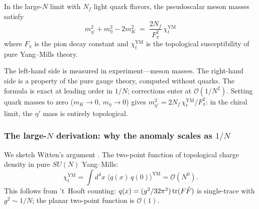 \begin{proposition}\label{prop:witten-veneziano}
In the large-$N$ limit with $N_f$ light quark flavors, the pseudoscalar meson masses satisfy
\begin{equation}\label{eq:witten-veneziano}
  \boxed{\;m_{\eta'}^2 + m_\eta^2 - 2m_K^2 \;=\; \frac{2N_f}{F_\pi^2}\,\chi_t^{\mathrm{YM}}\;}
\end{equation}
where $F_\pi$ is the pion decay constant and $\chi_t^{\mathrm{YM}}$ is the topological susceptibility of pure Yang--Mills theory.
\end{proposition}

\noindent The left-hand side is measured in experiment---meson masses.  The right-hand side is a property of the pure gauge theory, computed without quarks.  The formula is exact at leading order in $1/N$; corrections enter at $\mathcal{O}(1/N^2)$.  Setting quark masses to zero ($m_K\to 0$, $m_\eta\to 0$) gives $m_{\eta'}^2 = 2N_f\,\chi_t^{\mathrm{YM}}/F_\pi^2$: in the chiral limit, the $\eta'$ mass is entirely topological.

\subsubsection{The large-$N$ derivation: why the anomaly scales as $1/N$}

We sketch Witten's argument \cite{Witten1979U1GoldstoneBoson}.  The two-point function of topological charge density in pure $SU(N)$ Yang--Mills:
\begin{equation}\label{eq:chi-correlator-pure}
  \chi_t^{\mathrm{YM}} = \int d^4x\;\langle q(x)\,q(0)\rangle^{\mathrm{YM}} = \mathcal{O}(N^0).
\end{equation}
This follows from 't~Hooft counting: $q(x) = (g^2/32\pi^2)\operatorname{tr}(F\tilde{F})$ is single-trace with $g^2\sim 1/N$; the planar two-point function is $\mathcal{O}(1)$.

